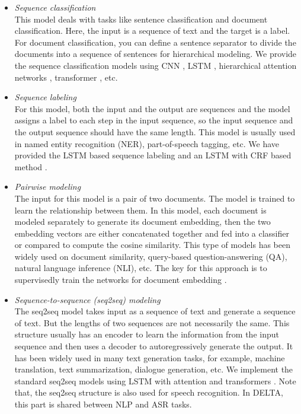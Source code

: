 \documentclass{article}
\begin{document}
\begin{itemize}
    \item \textit{Sequence classification}\\
    This model deals with tasks like sentence classification and document classification. Here, the input is a sequence of text and the target is a label. For document classification, you can define a sentence separator to divide the documents into a sequence of sentences for hierarchical modeling. We provide the sequence classification models using CNN \citep{kim2014convolutional,collobert2011natural}, LSTM \citep{tai2015improved}, hierarchical attention networks \citep{yang2016hierarchical}, transformer \citep{vaswani2017attention}, etc.

    \item \textit{Sequence labeling}\\
    For this model, both the input and the output are sequences and the model assigns a label to each step in the input sequence, so the input sequence and the output sequence should have the same length. This model is usually used in named entity recognition (NER), part-of-speech tagging, etc. We have provided the LSTM based sequence labeling \citep{chiu2016named} and an LSTM with CRF based method \citep{huang2015bidirectional,ma2016end,lample2016neural}.

    \item \textit{Pairwise modeling}\\
    The input for this model is a pair of two documents. The model is trained to learn the relationship between them. In this model, each document is modeled separately to generate its document embedding, then the two embedding vectors are either concatenated together and fed into a classifier or compared to compute the cosine similarity. This type of models has been widely used on document similarity, query-based question-answering (QA), natural language inference (NLI), etc. The key for this approach is to supervisedly train the networks for document embedding \citep{huang2013learning,bowman2015large,conneau-EtAl:2017:EMNLP2017}.

    \item \textit{Sequence-to-sequence (seq2seq) modeling} \\
    The seq2seq model takes input as a sequence of text and generate a sequence of text. But the lengths of two sequences are not necessarily the same. This structure usually has an encoder to learn the information from the input sequence and then uses a decoder to autoregressively generate the output. It has been widely used in many text generation tasks, for example, machine translation, text summarization, dialogue generation, etc. We implement the standard seq2seq models using LSTM with attention \citep{bahdanau2014neural} and transformers \citep{vaswani2017attention}. Note that, the seq2seq structure is also used for speech recognition. In DELTA, this part is shared between NLP and ASR tasks.


\end{itemize}
\end{document}
